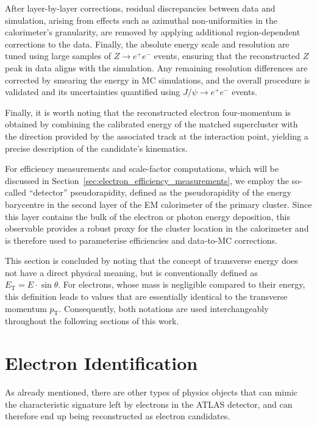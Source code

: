 After layer-by-layer corrections, residual discrepancies between data and simulation, arising from effects such as azimuthal non-uniformities in the calorimeter's granularity, are removed by applying additional region-dependent corrections to the data. Finally, the absolute energy scale and resolution are tuned using large samples of \(Z\to e^+e^-\) events, ensuring that the reconstructed \(Z\) peak in data aligns with the simulation. Any remaining resolution differences are corrected by smearing the energy in MC simulations, and the overall procedure is validated and its uncertainties quantified using \(J/\psi\to e^+e^-\) events.  

Finally, it is worth noting that the reconstructed electron four-momentum is obtained by combining the calibrated energy of the matched supercluster with the direction provided by the associated track at the interaction point, yielding a precise description of the candidate’s kinematics.

For efficiency measurements and scale-factor computations, which will be discussed in Section~\ref{sec:electron_efficiency_measurements}, we employ the so-called ``detector'' pseudorapidity, defined as the pseudorapidity of the energy barycentre in the second layer of the EM calorimeter of the primary cluster. Since this layer contains the bulk of the electron or photon energy deposition, this observable provides a robust proxy for the cluster location in the calorimeter and is therefore used to parameterise efficiencies and data-to-MC corrections.

This section is concluded by noting that the concept of transverse energy does not have a direct physical meaning, but is conventionally defined as $E_{\text{T}} = E \cdot \sin\theta$. For electrons, whose mass is negligible compared to their energy, this definition leads to values that are essentially identical to the transverse momentum $p_{\text{T}}$. Consequently, both notations are used interchangeably throughout the following sections of this work.

\section{Electron Identification}

As already mentioned, there are other types of physics objects that can mimic the characteristic signature left by electrons in the ATLAS detector, and can therefore end up being reconstructed as electron candidates. 

